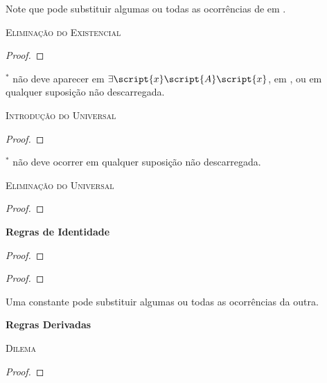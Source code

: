Note que  pode substituir algumas ou todas as ocorrências de  em .



\textsc{Eliminação do Existencial}

\begin{proof}
	\open	
	\close
	 
\end{proof}

$^\ast$  não deve aparecer em $\exists\script{x}\script{A}\script{x}$, em , ou em qualquer suposição não descarregada.

\textsc{Introdução do Universal}

\begin{proof}
	 
\end{proof}

$^\ast$  não deve ocorrer em qualquer suposição não descarregada.


\textsc{Eliminação do Universal}

\begin{proof}
	 
\end{proof}




{\LARGE \bf Regras de Identidade}

\begin{proof}
	 
\end{proof}

\begin{proof}
	 
\end{proof}

Uma constante pode substituir algumas ou todas as ocorrências da outra.





\newpage

{\LARGE \bf Regras Derivadas}

\textsc{Dilema}

\begin{proof}
	 
\end{proof}

